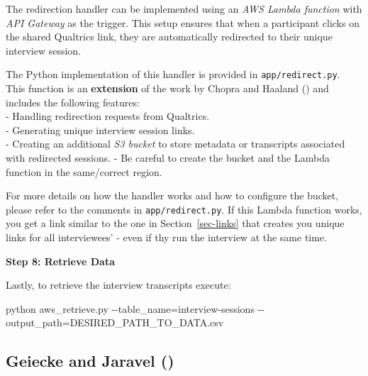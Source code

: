 \documentclass[
  letterpaper,
  DIV=11,
  numbers=noendperiod]{scrartcl}
\newenvironment{Shaded}{\begin{snugshade}}{\end{snugshade}}
\newcommand{\ExtensionTok}[1]{\textcolor[rgb]{0.00,0.23,0.31}{#1}}
\newcommand{\NormalTok}[1]{\textcolor[rgb]{0.00,0.23,0.31}{#1}}
\begin{document}
The redirection handler can be implemented using an \emph{AWS Lambda
function} with \emph{API Gateway} as the trigger. This setup ensures
that when a participant clicks on the shared Qualtrics link, they are
automatically redirected to their unique interview session.

The Python implementation of this handler is provided in
\texttt{app/redirect.py}.\\
This function is an \textbf{extension} of the work by Chopra and Haaland
() and includes the following
features:\\
- Handling redirection requests from Qualtrics.\\
- Generating unique interview session links.\\
- Creating an additional \emph{S3 bucket} to store metadata or
transcripts associated with redirected sessions. - Be careful to create
the bucket and the Lambda function in the same/correct region.

For more details on how the handler works and how to configure the
bucket, please refer to the comments in \texttt{app/redirect.py}. If
this Lambda function works, you get a link similar to the one in
Section~\ref{sec-links} that creates you unique links for all
interviewees' - even if thy run the interview at the same time.

\textbf{Step 8: Retrieve Data}

Lastly, to retrieve the interview transcripts execute:

\begin{Shaded}
\begin{Highlighting}[]
\ExtensionTok{python}\NormalTok{ aws\_retrieve.py }
    \ExtensionTok{{-}{-}table\_name=interview{-}sessions} 
    \ExtensionTok{{-}{-}output\_path=DESIRED\_PATH\_TO\_DATA.csv}
\end{Highlighting}
\end{Shaded}

\subsection{\texorpdfstring{Geiecke and Jaravel
()}{Geiecke and Jaravel (2025)}}\label{sec-replication-geiecke}
\end{document}
